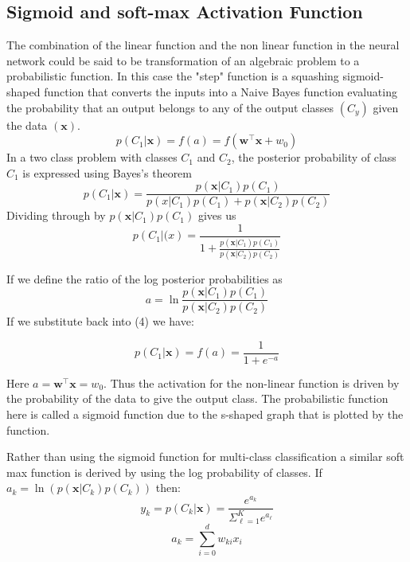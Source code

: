 \subsection{Sigmoid and soft-max Activation Function}
The combination of the linear function and the non linear function in the neural network could be said to be transformation of an algebraic problem to a probabilistic function.  In this case the "step" function is a squashing sigmoid-shaped function that converts the inputs into a Naive Bayes function evaluating the probability that an output belongs to any of the output classes $(C_y)$ given the data $(\mathbf{x})$.
\begin{equation}
p(C_1|\mathbf{x})=f(a)=f(\mathbf{w^\top x}+w_0)
\label{eqn_c3_nn_02}\end{equation}
In a two class problem with classes $C_1$ and $C_2$, the posterior probability of class $C_1$ is expressed using Bayes’s theorem
\begin{equation}
p(C_1|\mathbf{x})=\frac{p(\mathbf{x}|C_1)p(C_1)}{p(x|C_1)p(C_1)+p(\mathbf{x}|C_2)p(C_2)}
\label{eqn_c3_nn_03}\end{equation}
Dividing through by $p(\mathbf{x}|C_1)p(C_1)$ gives us
\begin{equation}
p(C_1|\mathbf(x)=\frac{1}{1+\frac{p(\mathbf{x}|C_1)p(C_1)}{p(\mathbf{x}|C_2)p(C_2)}}
\label{eqn_c3_nn_04}\end{equation}

If we define the ratio of the log posterior probabilities as
\begin{equation}
a=\ln\frac{p(\mathbf{x}|C_1)p(C_1)}{p(\mathbf{x}|C_2)p(C_2)}
\label{eqn_c3_nn_05}\end{equation}
If we substitute back into (4) we have:

\begin{equation}p(C_1|\mathbf{x})=f(a)=\frac{1}{1+e^{-a}}
\label{eqn_c3_nn_06}
\end{equation}

Here $a=\mathbf{w^\top x}=w_0$.  Thus the activation for the non-linear function is driven by the probability of the data to give the output class.  The probabilistic function here is called a sigmoid function due to the s-shaped graph that is plotted by the function.

Rather than using the sigmoid function for multi-class classification a similar soft max function is derived by using the log probability of classes. If $a_k=\ln(p(\mathbf{x}|C_k)p(C_k))$ then:
\begin{equation}
y_k=p(C_k|\mathbf{x})=\frac{e^{a_k}}{\Sigma_{\ell=1}^K e^{a_\ell}}
\label{eqn_c3_nn_07}\end{equation}
\begin{equation}
a_k=\sum_{i=0}^dw_{ki}x_i
\label{eqn_c3_nn_08}\end{equation}

